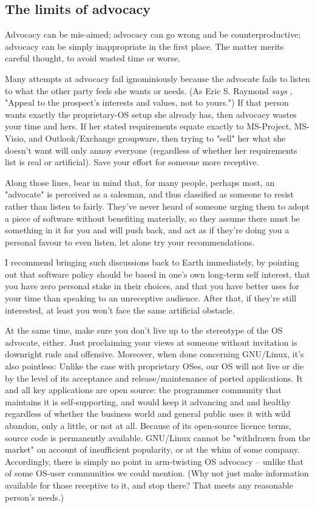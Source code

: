 \subsection{The limits of advocacy}

Advocacy can be mis-aimed; advocacy can go wrong and be
counterproductive; advocacy can be simply inappropriate in the first
place.  The matter merits careful thought, to avoid wasted time or
worse.

Many attempts at advocacy fail ignominiously because the advocate fails
to listen to what the other party feels she wants or needs.  (As Eric
S. Raymond 
\emph{says} \texttt{\acnurl}
, 
"Appeal to the prospect's interests and values, not to
yours.") If that person wants exactly the proprietary-OS setup she
already has, then advocacy wastes your time and hers.  If her
stated requirements equate exactly to MS-Project, MS-Visio, and
Outlook/Exchange groupware, then trying to "sell" her what she doesn't
want will only annoy everyone (regardless of whether her requirements
list is real or artificial).  Save your effort for someone more
receptive.  

Along those lines, bear in mind that, for many people, perhaps most, an
"advocate" is perceived as a salesman, and thus classified as someone to
resist rather than listen to fairly.  They've never heard of someone
urging them to adopt a piece of software without
benefiting materially, so they assume there must be something in
it for you and will push back, and
act as if they're doing you a personal favour to even listen, let alone
try your recommendations.  

I recommend bringing such discussions back to Earth
immediately, by pointing out that software policy should be based in
one's own long-term self interest, that you have zero personal stake in
their choices, and that you have better uses for your time than speaking
to an unreceptive audience. After that, if
they're still interested, at least you won't face the same artificial
obstacle.

At the same time, make sure you don't live up to the stereotype of the
OS advocate, either.  Just proclaiming your views at someone without
invitation is downright rude and offensive.  Moreover, when done
concerning GNU/Linux, it's also pointless:  Unlike the case with proprietary
OSes, our OS will not live or die by the level of its acceptance and
release/maintenance of ported applications.  It and all key applications
are open source: the programmer community that maintains it is
self-supporting, and would keep it advancing and and healthy regardless
of whether the business world and general public uses it with wild
abandon, only a little, or not at all. Because of its open-source
licence terms, source code is permanently available. GNU/Linux cannot be
"withdrawn from the market" on account of insufficient popularity, or at
the whim of some company.  Accordingly, there is simply no point in
arm-twisting OS advocacy -- unlike that of some OS-user communities we
could mention.   (Why not just make information available for those
receptive to it, and stop there?  That meets any reasonable person's
needs.)

